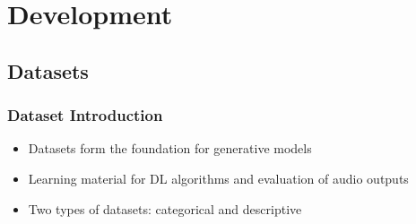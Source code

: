 \section{Development}

\subsection{Datasets}

\begin{frame}
    \frametitle{Dataset Introduction}

    \begin{itemize}
        \item Datasets form the foundation for generative models
        \item Learning material for DL algorithms and evaluation of audio outputs
        \item Two types of datasets: categorical and descriptive
    \end{itemize}

\end{frame}

